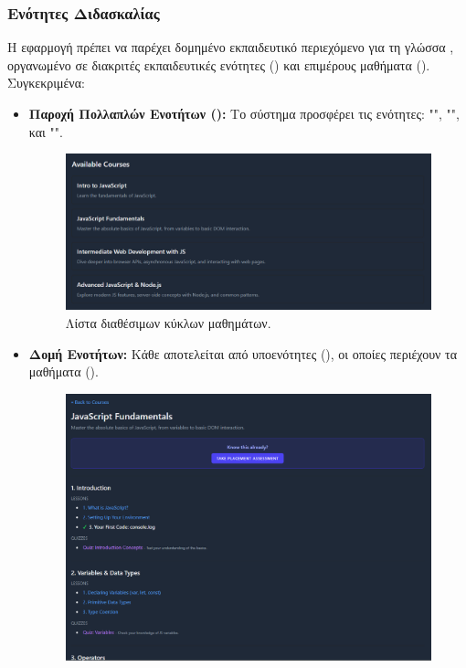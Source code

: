 \subsubsection{Ενότητες Διδασκαλίας}
\label{sec:enotites_didaskalias}
Η εφαρμογή πρέπει να παρέχει δομημένο εκπαιδευτικό περιεχόμενο για τη γλώσσα , οργανωμένο σε διακριτές εκπαιδευτικές ενότητες () και επιμέρους μαθήματα (). Συγκεκριμένα:
\begin{itemize}[leftmargin=*, noitemsep]
    \item \textbf{Παροχή Πολλαπλών Ενοτήτων ():} Το σύστημα προσφέρει τις ενότητες: "", "", και "".
        \begin{figure}[h!]
          \centering
          \includegraphics[scale=0.5]{images/courses_list.png}
          \caption{Λίστα διαθέσιμων κύκλων μαθημάτων.}
          \label{fig:courses_list_placeholder}
        \end{figure}
    \item \textbf{Δομή Ενοτήτων:} Κάθε  αποτελείται από υποενότητες (), οι οποίες περιέχουν τα μαθήματα ().
        \begin{figure}[h!]
          \centering
          \includegraphics[scale=0.4]{images/module_example.png}

\end{figure}
\end{itemize}
